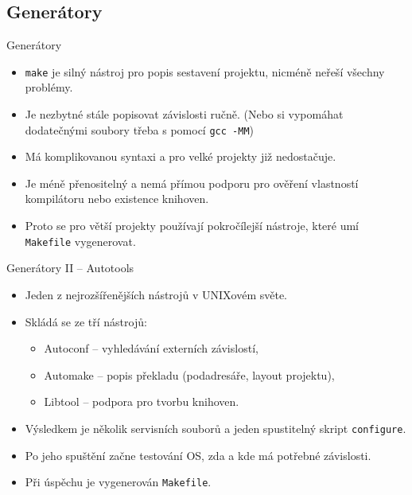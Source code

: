 \documentclass[handout]{beamer}
\begin{document}
\subsection{Generátory}
\begin{frame}{Generátory}
    \begin{itemize}
        \item \texttt{make} je silný nástroj pro popis sestavení projektu, nicméně neřeší všechny problémy.
        \item Je nezbytné stále popisovat závislosti ručně. (Nebo si vypomáhat dodatečnými soubory třeba s pomocí \texttt{gcc -MM})
        \item Má komplikovanou syntaxi a pro velké projekty již nedostačuje.
        \item Je méně přenositelný a nemá přímou podporu pro ověření vlastností kompilátoru nebo existence knihoven.
        \item Proto se pro větší projekty používají pokročílejší nástroje, které umí \texttt{Makefile} vygenerovat.
    \end{itemize}
\end{frame}
\begin{frame}{Generátory II -- Autotools}
    \begin{itemize}
        \item Jeden z nejrozšířenějších nástrojů v UNIXovém světe.
        \item Skládá se ze tří nástrojů:
            \begin{itemize}
                 \item Autoconf -- vyhledávání externích závislostí,
                 \item Automake -- popis překladu (podadresáře, layout projektu),
                \item Libtool -- podpora pro tvorbu knihoven.
            \end{itemize}
        \item Výsledkem je několik servisních souborů a jeden spustitelný skript \texttt{configure}.
        \item Po jeho spuštění začne testování OS, zda a kde má potřebné závislosti.
        \item Při úspěchu je vygenerován \texttt{Makefile}.
    \end{itemize}
\end{frame}
\end{document}

